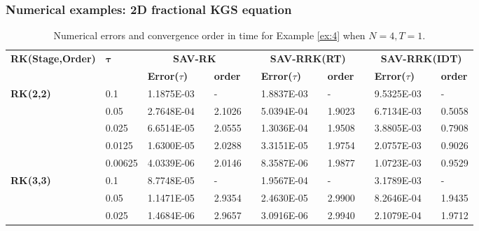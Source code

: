 \documentclass[aspectratio=169]{beamer}
\begin{document}
	\begin{frame}\frametitle{Numerical examples: 2D fractional KGS equation}
	\begin{table}[H]\tiny
	  \centering
	  \caption{Numerical errors and convergence order in time for Example \ref{ex:4} when $N=4, T = 1$.}
	  \begin{tabular}{lllllrlrlrlrlrl}
	  \toprule
	  \multicolumn{2}{l}{\multirow{2}[3]{*}{\textbf{RK(Stage,Order)}}} & \multicolumn{2}{l}{\multirow{2}[3]{*}{$\bm{\tau}$}} & \multicolumn{3}{c}{\textbf{SAV-RK}} &       & \multicolumn{3}{c}{\textbf{SAV-RRK(RT)}} &       & \multicolumn{3}{c}{\textbf{SAV-RRK(IDT)}} \\
	  \cmidrule{5-7}\cmidrule{9-11}\cmidrule{13-15}    \multicolumn{2}{l}{} & \multicolumn{2}{l}{} & \textbf{Error($\tau$)} &       & \textbf{order} &       & \textbf{Error($\tau$)} &       & \textbf{order} &       & \textbf{Error($\tau$)} &       & \textbf{order} \\
	  \hline
	  \multicolumn{2}{l}{\multirow{5}[0]{*}{\textbf{RK(2,2)}}} & \multicolumn{2}{l}{0.1} & 1.1875E-03 &       & -     &       & 1.8837E-03 &       & -     &       & 9.5325E-03 &       & - \\
	  \multicolumn{2}{l}{} & \multicolumn{2}{l}{0.05} & 2.7648E-04 &       & 2.1026  &       & 5.0394E-04 &       & 1.9023  &       & 6.7134E-03 &       & 0.5058  \\
	  \multicolumn{2}{l}{} & \multicolumn{2}{l}{0.025} & 6.6514E-05 &       & 2.0555  &       & 1.3036E-04 &       & 1.9508  &       & 3.8805E-03 &       & 0.7908  \\
	  \multicolumn{2}{l}{} & \multicolumn{2}{l}{0.0125} & 1.6300E-05 &       & 2.0288  &       & 3.3151E-05 &       & 1.9754  &       & 2.0757E-03 &       & 0.9026  \\
	  \multicolumn{2}{l}{} & \multicolumn{2}{l}{0.00625} & 4.0339E-06 &       & 2.0146  &       & 8.3587E-06 &       & 1.9877  &       & 1.0723E-03 &       & 0.9529  \\
	  \multicolumn{2}{l}{\multirow{5}[0]{*}{\textbf{RK(3,3)}}} & \multicolumn{2}{l}{0.1} & 8.7748E-05 &       & -     &       & 1.9567E-04 &       & -     &       & 3.1789E-03 &       & - \\
	  \multicolumn{2}{l}{} & \multicolumn{2}{l}{0.05} & 1.1471E-05 &       & 2.9354  &       & 2.4630E-05 &       & 2.9900  &       & 8.2646E-04 &       & 1.9435  \\
	  \multicolumn{2}{l}{} & \multicolumn{2}{l}{0.025} & 1.4684E-06 &       & 2.9657  &       & 3.0916E-06 &       & 2.9940  &       & 2.1079E-04 &       & 1.9712  \\

\end{tabular}
\end{table}
\end{frame}
\end{document}

